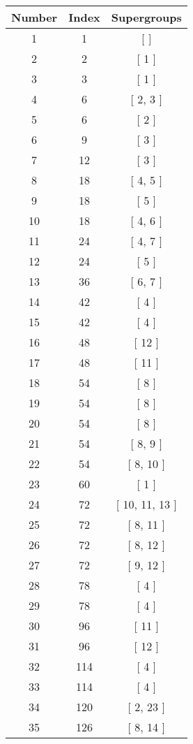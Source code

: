 \begin{center}
\begin{longtable}[H]{|| c c c ||}
\hline
Number & Index & Supergroups \\ 
\hline
1 & 1 & [ ] \\ 
\hline
2 & 2 & [ 1 ] \\ 
\hline
3 & 3 & [ 1 ] \\ 
\hline
4 & 6 & [ 2, 3 ] \\ 
\hline
5 & 6 & [ 2 ] \\ 
\hline
6 & 9 & [ 3 ] \\ 
\hline
7 & 12 & [ 3 ] \\ 
\hline
8 & 18 & [ 4, 5 ] \\ 
\hline
9 & 18 & [ 5 ] \\ 
\hline
10 & 18 & [ 4, 6 ] \\ 
\hline
11 & 24 & [ 4, 7 ] \\ 
\hline
12 & 24 & [ 5 ] \\ 
\hline
13 & 36 & [ 6, 7 ] \\ 
\hline
14 & 42 & [ 4 ] \\ 
\hline
15 & 42 & [ 4 ] \\ 
\hline
16 & 48 & [ 12 ] \\ 
\hline
17 & 48 & [ 11 ] \\ 
\hline
18 & 54 & [ 8 ] \\ 
\hline
19 & 54 & [ 8 ] \\ 
\hline
20 & 54 & [ 8 ] \\ 
\hline
21 & 54 & [ 8, 9 ] \\ 
\hline
22 & 54 & [ 8, 10 ] \\ 
\hline
23 & 60 & [ 1 ] \\ 
\hline
24 & 72 & [ 10, 11, 13 ] \\ 
\hline
25 & 72 & [ 8, 11 ] \\ 
\hline
26 & 72 & [ 8, 12 ] \\ 
\hline
27 & 72 & [ 9, 12 ] \\ 
\hline
28 & 78 & [ 4 ] \\ 
\hline
29 & 78 & [ 4 ] \\ 
\hline
30 & 96 & [ 11 ] \\ 
\hline
31 & 96 & [ 12 ] \\ 
\hline
32 & 114 & [ 4 ] \\ 
\hline
33 & 114 & [ 4 ] \\ 
\hline
34 & 120 & [ 2, 23 ] \\ 
\hline
35 & 126 & [ 8, 14 ] \\ 
\hline

\end{longtable}
\end{center}
